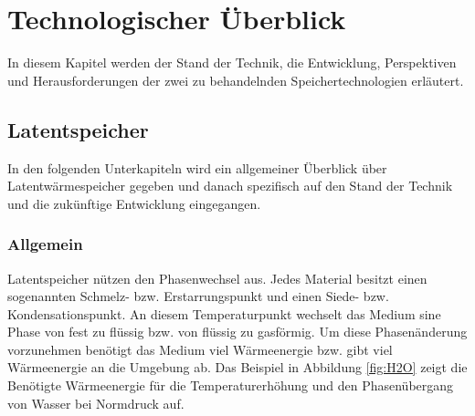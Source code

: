\documentclass[11pt,a4paper]{scrartcl}
\begin{document}
\section{Technologischer Überblick}
In diesem Kapitel werden der Stand der Technik, die Entwicklung, Perspektiven
und Herausforderungen der zwei zu behandelnden Speichertechnologien erläutert.
\subsection{Latentspeicher}
In den folgenden Unterkapiteln wird ein allgemeiner Überblick über
Latentwärmespeicher gegeben und danach spezifisch auf den Stand der Technik und
die zukünftige Entwicklung eingegangen.
\subsubsection{Allgemein}
Latentspeicher nützen den Phasenwechsel aus. Jedes Material besitzt einen
sogenannten Schmelz- bzw. Erstarrungspunkt und einen Siede- bzw.
Kondensationspunkt. An diesem Temperaturpunkt wechselt das Medium sine Phase von
fest zu flüssig bzw. von flüssig zu gasförmig. Um diese Phasenänderung
vorzunehmen benötigt das Medium viel Wärmeenergie bzw. gibt viel Wärmeenergie an
die Umgebung ab. Das Beispiel in Abbildung \ref{fig:H2O} zeigt die Benötigte
Wärmeenergie für die Temperaturerhöhung und den Phasenübergang von Wasser bei
Normdruck auf.
\end{document}
